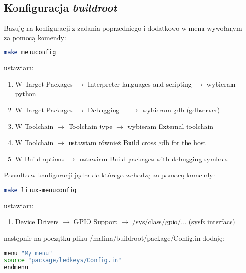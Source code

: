 \subsection{Konfiguracja \emph{buildroot}}
Bazuję na konfiguracji z zadania poprzedniego i dodatkowo w menu wywołanym za pomocą komendy:
\begin{lstlisting}[language=bash]
make menuconfig
\end{lstlisting}	
ustawiam:
\begin{enumerate}
	\item W Target Packages $\rightarrow$ Interpreter languages and scripting $\rightarrow$ wybieram python
	\item W Target Packages $\rightarrow$ Debugging ... $\rightarrow$ wybieram gdb (gdbserver)
	\item W Toolchain $\rightarrow$ Toolchain type $\rightarrow$ wybieram External toolchain
	\item W Toolchain $\rightarrow$ ustawiam również Build cross gdb for the host
	\item W Build options $\rightarrow$ ustawiam Build packages with debugging symbols
\end{enumerate}

Ponadto w konfiguracji jądra do którego wchodzę za pomocą komendy:
	\begin{lstlisting}[language=bash]
make linux-menuconfig
	\end{lstlisting}	
ustawiam:
\begin{enumerate}
	\item Device Drivers $\rightarrow$ GPIO Support $\rightarrow$ /sys/class/gpio/... (sysfs interface)
\end{enumerate}

następnie na początku pliku /malina/buildroot/package/Config.in dodaję:
\begin{lstlisting}[language=bash]
menu "My menu"
source "package/ledkeys/Config.in"
endmenu
\end{lstlisting}

